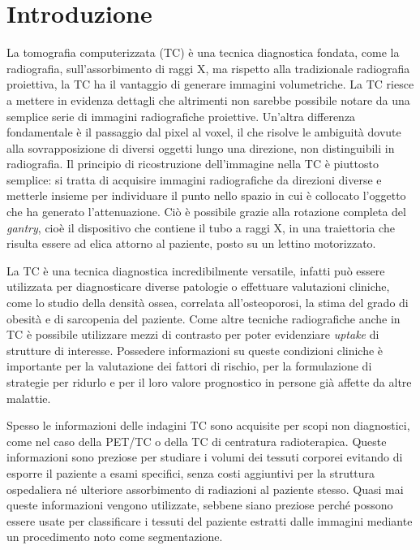 \chapter*{Introduzione}
La tomografia computerizzata (TC) è una tecnica diagnostica fondata, come la radiografia, sull'assorbimento di raggi X, ma rispetto alla tradizionale radiografia proiettiva, la TC ha il vantaggio di generare immagini volumetriche. La TC riesce a mettere in evidenza dettagli che altrimenti non sarebbe possibile notare da una semplice serie di immagini radiografiche proiettive. Un'altra differenza fondamentale è il passaggio dal pixel al voxel, il che risolve le ambiguità dovute alla sovrapposizione di diversi oggetti lungo una direzione, non distinguibili in radiografia. Il principio di ricostruzione dell'immagine nella TC è piuttosto semplice: si tratta di acquisire immagini radiografiche da direzioni diverse e metterle insieme per individuare il punto nello spazio in cui è collocato l'oggetto che ha generato l'attenuazione. Ciò è possibile grazie alla rotazione completa del \textit{gantry}, cioè il dispositivo che contiene il tubo a raggi X, in una traiettoria che risulta essere ad elica attorno al paziente, posto su un lettino motorizzato.

La TC è una tecnica diagnostica incredibilmente versatile, infatti può essere utilizzata per diagnosticare diverse patologie o effettuare valutazioni cliniche, come lo studio della densità ossea, correlata all'osteoporosi, la stima del grado di obesità e di sarcopenia del paziente. Come altre tecniche radiografiche anche in TC è possibile utilizzare mezzi di contrasto per poter evidenziare \textit{uptake} di strutture di interesse. Possedere informazioni su queste condizioni cliniche è importante per la valutazione dei fattori di rischio, per la formulazione di strategie per ridurlo e per il loro valore prognostico in persone già affette da altre malattie.

Spesso le informazioni delle indagini TC sono acquisite per scopi non diagnostici, come nel caso della PET/TC o della TC di centratura radioterapica. Queste informazioni sono preziose per studiare i volumi dei tessuti corporei evitando di esporre il paziente a esami specifici, senza costi aggiuntivi per la struttura ospedaliera né ulteriore assorbimento di radiazioni al paziente stesso. Quasi mai queste informazioni vengono utilizzate, sebbene siano preziose perché possono essere usate per classificare i tessuti del paziente estratti dalle immagini mediante un procedimento noto come segmentazione.

